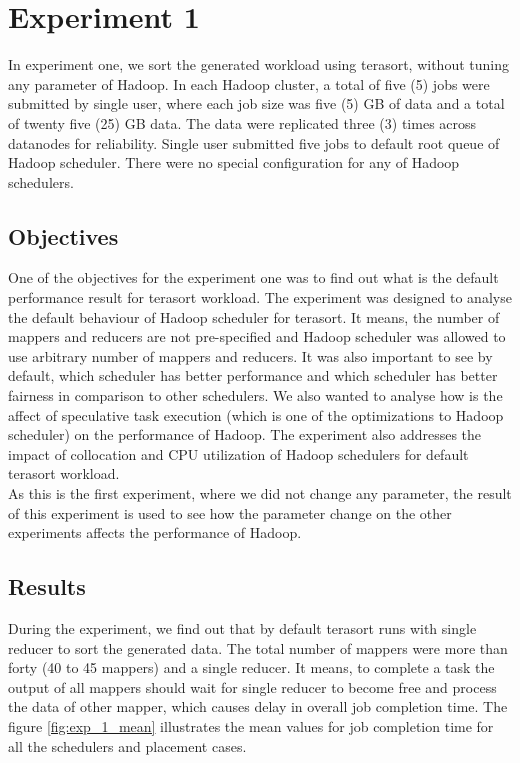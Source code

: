 \section{Experiment 1}

 In experiment one, we sort the generated workload using terasort, without tuning any parameter of Hadoop.  In each Hadoop cluster, a total of five (5) jobs were submitted by single user, where each job size was five (5) GB of data and a total of twenty five (25) GB data. The data were replicated three (3) times across datanodes for reliability. Single user submitted five jobs to default root queue of Hadoop scheduler.  There were no special configuration for any of Hadoop schedulers.\\  
 
 


\subsection{Objectives}
  
  One of the objectives for the experiment one was to find out what is the default performance result for terasort workload. The experiment was designed to analyse the default behaviour of Hadoop scheduler for terasort. It means, the number of mappers and reducers are not pre-specified and Hadoop scheduler was allowed to use arbitrary number of mappers and reducers. It was also important to see by default, which scheduler has better performance and which scheduler has better fairness in comparison to other schedulers. We also wanted to analyse how is the affect of speculative task execution (which is one of the optimizations to Hadoop scheduler)‌ on the performance of Hadoop. The experiment also addresses the impact of collocation and CPU utilization of Hadoop schedulers for default terasort workload.\\
 
  As this is the first experiment, where we did not change any parameter, the result of this experiment is used to see how the parameter change on the other experiments affects the performance of Hadoop.\\  

 
\subsection{Results}
 
  During the experiment, we find out that by default terasort runs with single reducer to sort the generated data. The total number of mappers were more than forty (40 to 45 mappers) and a single reducer. It means, to complete a task the output of all mappers should wait for single reducer to become free and process the data of other mapper, which causes delay in overall job completion time. The figure \ref{fig:exp_1_mean} illustrates the mean values for job completion time for all the schedulers and placement cases.\\
 

